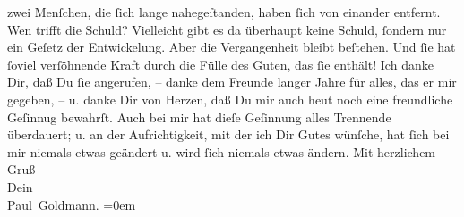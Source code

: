 \begin{ledgroupsized}[t]{13cm}
               zwei Menſchen, die ſich lange nahegeſtanden, haben ſich von einander entfernt. Wen
               trifft die Schuld? Vielleicht gibt es da überhaupt keine Schuld, ſondern nur ein
               Geſetz der Entwickelung.\pend
           \pstart
           Aber die Vergangenheit {\pb}bleibt beſtehen. Und ſie
               hat ſoviel verſöhnende Kraft durch die Fülle des Guten, das ſie enthält! Ich danke
               Dir, daß Du ſie angerufen, – danke dem Freunde langer Jahre für alles, das er mir
               gegeben, – u. danke Dir von Herzen, daß Du mir auch heut noch eine freundliche
               Geſinnug bewahrſt. Auch bei mir hat dieſe Geſinnung alles Trennende überdauert; {\pb}u. an der Aufrichtigkeit, mit der ich Dir Gutes
               wünſche, hat ſich bei mir niemals etwas geändert u. wird ſich niemals etwas
               ändern.\pend
           \pstart
           Mit herzlichem Gruß {\\[\baselineskip]}Dein {\\[\baselineskip]}\spacefill\mbox{Paul Goldmann.}\pend
           \leftskip=0em{}
         
         \endnumbering{}\end{ledgroupsized}\begin{anhang}\end{anhang}\newcommand{\dateiname}{L03477}\newcommand{\titel}{Paul Goldmann an Arthur Schnitzler, 10. 2. 1915}\newcommand{\editorInnen}{Martin Anton Müller und Laura Untner}
      